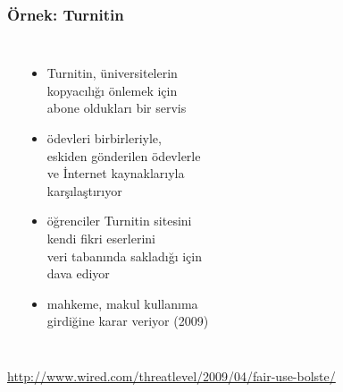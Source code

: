\documentclass[dvipsnames]{beamer}
\theoremstyle{definition}
\theoremstyle{example}
\theoremstyle{plain}
\begin{document}
\begin{frame}
  \frametitle{Örnek: Turnitin}

  \begin{columns}
    \begin{center}
    \end{center}

    \begin{itemize}
      \item Turnitin, üniversitelerin\\
        kopyacılığı önlemek için\\
        abone oldukları bir servis
      \item ödevleri birbirleriyle,\\
        eskiden gönderilen ödevlerle\\
        ve İnternet kaynaklarıyla\\
        karşılaştırıyor
      \item öğrenciler Turnitin sitesini\\
        kendi fikri eserlerini\\
        veri tabanında sakladığı için\\
        dava ediyor
      \item mahkeme, makul kullanıma\\
        girdiğine karar veriyor (2009)
    \end{itemize}
  \end{columns}

  \medskip
  \tiny{\url{http://www.wired.com/threatlevel/2009/04/fair-use-bolste/}}\\
\end{frame}

% 
\end{document}
